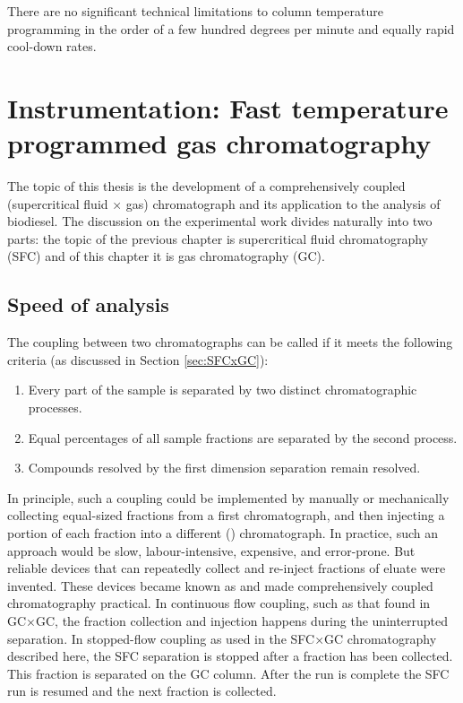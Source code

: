 
\begin{savequote}[\quotewidth] There are no significant technical limitations to column
temperature programming in the order of a few hundred degrees per minute and
equally rapid cool-down rates.
\end{savequote}

\chapter[Instrumentation: Fast GC]{Instrumentation: Fast temperature programmed gas chromatography} %

\label{Chapter5} %

The topic of this thesis is the development of a comprehensively coupled
(supercritical fluid × gas) chromatograph and its application to the analysis of
biodiesel. The discussion on the experimental work divides naturally into two
parts: the topic of the previous chapter is supercritical fluid chromatography
(SFC) and of this chapter it is gas chromatography (GC).

\section{Speed of analysis}
\label{sec:SpeedOfAnalysis}

The coupling between two chromatographs can be called  if
it meets the following criteria (as discussed in Section \ref{sec:SFCxGC}):
\begin{enumerate}
  \item Every part of the sample is separated by two distinct chromatographic processes.
  \item Equal percentages of all sample fractions are separated by the second process.	 
  \item Compounds resolved by the first dimension separation remain resolved.  
\end{enumerate} 

In principle, such a coupling could be implemented by manually or mechanically
collecting equal-sized fractions from a first \oneD chromatograph, and then
injecting a portion of each fraction into a different (\twoD) chromatograph. In
practice, such an approach would be slow, labour-intensive, expensive, and
error-prone. But reliable devices that can repeatedly collect and re-inject
fractions of eluate were invented. These devices became known as
 and made comprehensively coupled chromatography practical.
In continuous flow coupling, such as that found in GC×GC, the fraction
collection and \twoD injection happens during the uninterrupted \oneD
separation. In stopped-flow coupling as used in the SFC×GC chromatography
described here, the \oneD SFC separation is stopped after a fraction has been
collected. This fraction is separated on the \twoD GC column. After the \twoD
run is complete the SFC run is resumed and the next fraction is collected.

